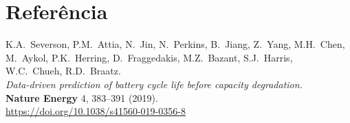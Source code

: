 \documentclass[12pt,a4paper]{article}
\begin{document}
\section*{Refer\^{e}ncia}

K.A.\ Severson, P.M.\ Attia, N.\ Jin, N.\ Perkins, B.\ Jiang, Z.\ Yang,
M.H.\ Chen, M.\ Aykol, P.K.\ Herring, D.\ Fraggedakis, M.Z.\ Bazant,
S.J.\ Harris, W.C.\ Chueh, R.D.\ Braatz.\\
\textit{Data-driven prediction of battery cycle life before capacity degradation.}\\
\textbf{Nature Energy} 4, 383--391 (2019).\\
\url{https://doi.org/10.1038/s41560-019-0356-8}
\end{document}
